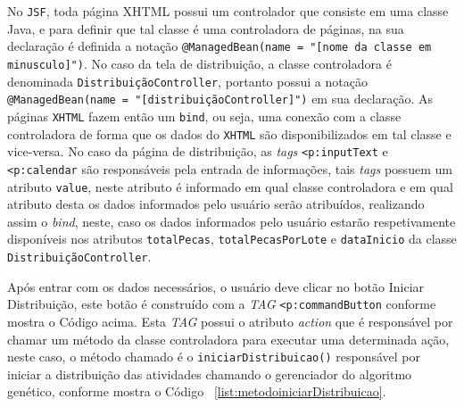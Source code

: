 \par No \texttt{JSF}, toda página XHTML possui um controlador que consiste em uma classe Java, e para definir que tal 
classe é uma controladora de páginas, na sua declaração é definida a notação \texttt{@ManagedBean(name = "[nome da classe em minusculo]")}.
No caso da tela de distribuição, a classe controladora é denominada \texttt{DistribuiçãoController}, portanto possui a notação
\texttt{@ManagedBean(name = "[distribuiçãoController]")} em sua declaração. As páginas \texttt{XHTML} fazem então um \texttt{bind}, ou
seja, uma conexão com a classe controladora de forma que os dados do \texttt{XHTML} são disponibilizados em tal classe e vice-versa. 
No caso da página de distribuição, as \textit{tags} \texttt{<p:inputText} e \texttt{<p:calendar} são responsáveis pela entrada de 
informações, tais \textit{tags} possuem um atributo \texttt{value}, neste atributo é informado em qual classe controladora e em qual 
atributo desta os dados informados pelo usuário serão atribuídos, realizando assim o \textit{bind}, neste, caso os dados informados pelo 
usuário estarão respetivamente disponíveis nos atributos \texttt{totalPecas}, \texttt{totalPecasPorLote} e \texttt{dataInicio} da
classe \texttt{DistribuiçãoController}.

\par Após entrar com os dados necessários, o usuário deve clicar no botão Iniciar Distribuição, este botão é construído com a
\textit{TAG} \texttt{<p:commandButton} conforme mostra o Código acima. Esta \textit{TAG} possui o atributo \textit{action} que 
é responsável por chamar um método da classe controladora para executar uma determinada ação, neste caso, o método chamado é o 
\texttt{iniciarDistribuicao()} responsável por iniciar a distribuição das atividades chamando o gerenciador do algoritmo genético, 
conforme mostra o Código ~\ref{list:metodoiniciarDistribuicao}.

